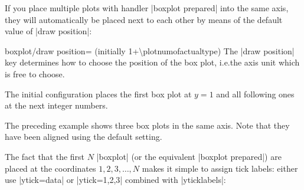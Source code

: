 If you place multiple plots with handler |boxplot prepared| into the same axis,
they will automatically be placed next to each other by means of the default
value of |draw position|:

\begin{pgfplotskey}{boxplot/draw position= (initially 1+\textbackslash plotnumofactualtype)}
    The |draw position| key determines how to choose the position of the box
    plot, i.e.\@ the axis unit which is free to choose.

    The initial configuration places the first box plot at $y=1$ and all
    following ones at the next integer numbers.
\begin{codeexample}[]
\end{codeexample}
    The preceding example shows three box plots in the same axis. Note that
    they have been aligned using the default setting.

    The fact that the first $N$ |boxplot| (or the equivalent
    |boxplot prepared|) are placed at the coordinates $1,2,3, \dotsc,N$ makes
    it simple to assign tick labels: either use |ytick=data| or |ytick=1,2,3|
    combined with |yticklabels|:
\begin{codeexample}[]
\end{codeexample}
\end{pgfplotskey}

